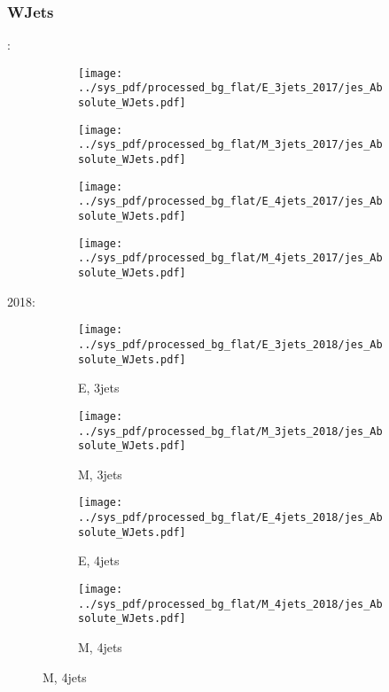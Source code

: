 \documentclass{beamer}
\begin{document}
\begin{frame}
\frametitle{WJets}
\fontsize{5}{1}:
\begin{figure}
\centering
\begin{subfigure}[b]{0.24\textwidth}
\texttt{[image: ../sys\_pdf/processed\_bg\_flat/E\_3jets\_2017/jes\_Absolute\_WJets.pdf]}
\end{subfigure}
\begin{subfigure}[b]{0.24\textwidth}
\texttt{[image: ../sys\_pdf/processed\_bg\_flat/M\_3jets\_2017/jes\_Absolute\_WJets.pdf]}
\end{subfigure}
\begin{subfigure}[b]{0.24\textwidth}
\texttt{[image: ../sys\_pdf/processed\_bg\_flat/E\_4jets\_2017/jes\_Absolute\_WJets.pdf]}
\end{subfigure}
\begin{subfigure}[b]{0.24\textwidth}
\texttt{[image: ../sys\_pdf/processed\_bg\_flat/M\_4jets\_2017/jes\_Absolute\_WJets.pdf]}
\end{subfigure}
\end{figure}
2018:
\begin{figure}
\centering
\begin{subfigure}[b]{0.24\textwidth}
\texttt{[image: ../sys\_pdf/processed\_bg\_flat/E\_3jets\_2018/jes\_Absolute\_WJets.pdf]}
\captionsetup{font=tiny}
\caption{E, 3jets}
\end{subfigure}
\begin{subfigure}[b]{0.24\textwidth}
\texttt{[image: ../sys\_pdf/processed\_bg\_flat/M\_3jets\_2018/jes\_Absolute\_WJets.pdf]}
\captionsetup{font=tiny}
\caption{M, 3jets}
\end{subfigure}
\begin{subfigure}[b]{0.24\textwidth}
\texttt{[image: ../sys\_pdf/processed\_bg\_flat/E\_4jets\_2018/jes\_Absolute\_WJets.pdf]}
\captionsetup{font=tiny}
\caption{E, 4jets}
\end{subfigure}
\begin{subfigure}[b]{0.24\textwidth}
\texttt{[image: ../sys\_pdf/processed\_bg\_flat/M\_4jets\_2018/jes\_Absolute\_WJets.pdf]}
\captionsetup{font=tiny}
\caption{M, 4jets}
\end{subfigure}
\end{figure}
\end{frame}
\end{document}
